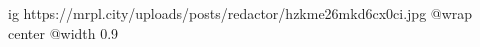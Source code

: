  
 
 
 
 

\ifcmt
  ig https://mrpl.city/uploads/posts/redactor/hzkme26mkd6cx0ci.jpg
  @wrap center
  @width 0.9
\fi
